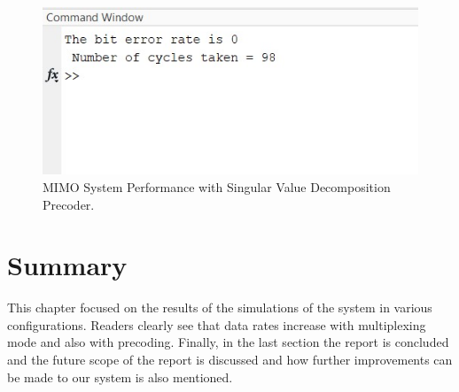 \begin{figure}[!htbp]
\centering
\includegraphics[scale=1]{Chapter 4/Figures/MIMO System Performance Inverse Channel Estimation}
\caption{MIMO System Performance with Singular Value Decomposition Precoder.}
\label{fig:mimo system performance singular value decomposition}
\end{figure}

\section*{Summary}
This chapter focused on the results of the simulations of the system in various configurations. Readers clearly see that data rates increase with multiplexing mode and also with precoding. Finally, in the last section the report is concluded and the future scope of the report is discussed and how further improvements can be made to our system is also mentioned.




